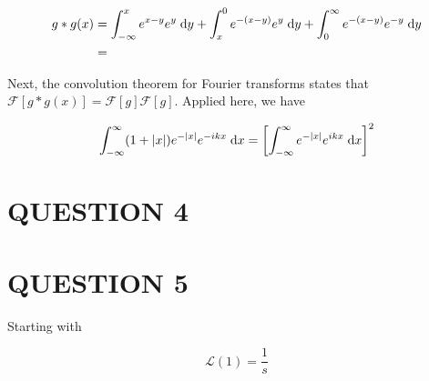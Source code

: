 \documentclass[a4paper]{article}
\begin{document}
\begin{align*}
g * g(x) & = \int_{-\infty}^{x} e^{x - y} e^{y} \; \mathrm{d} y + \int_{x}^{0} e^{-(x - y)} e^{y} \; \mathrm{d} y + \int_{0}^{\infty} e^{-(x - y)} e^{-y} \; \mathrm{d} y \\
& = 
\end{align*}


Next, the convolution theorem for Fourier transforms states that $ \mathcal{F}[g * g(x)] = \mathcal{F}[g] \mathcal{F}[g] $. Applied here, we have

\[ \int_{-\infty}^{\infty} (1 + | x |)e^{-| x |} e^{-ikx} \; \mathrm{d} x = \left[  \int_{-\infty}^{\infty} e^{-| x |} e^{ikx} \; \mathrm{d} x \right]^{2}   \]

\section{QUESTION 4}
\section{QUESTION 5}

Starting with 

\[ \mathcal{L}(1) = \frac{1}{s} \]
\end{document}
